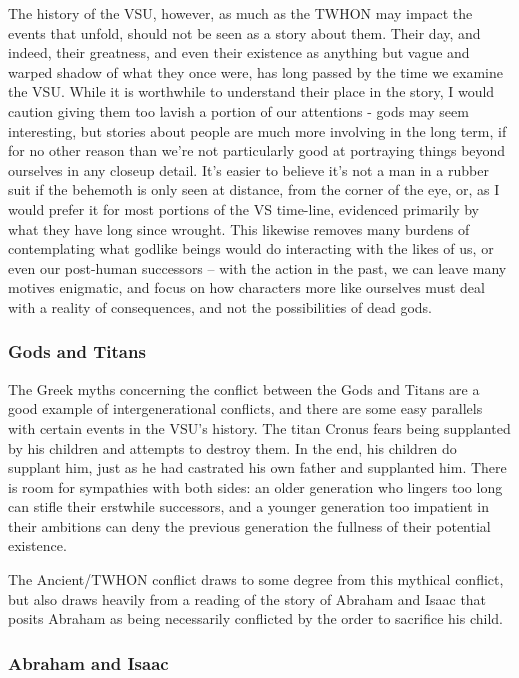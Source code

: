 The history of the VSU, however, as much as the TWHON may impact the
events that unfold, should not be seen as a story about them. Their
day, and indeed, their greatness, and even their existence as anything
but vague and warped shadow of what they once were, has long passed by
the time we examine the VSU. While it is worthwhile to understand
their place in the story, I would caution giving them too lavish a
portion of our attentions - gods may seem interesting, but stories
about people are much more involving in the long term, if for no other
reason than we're not particularly good at portraying things beyond
ourselves in any closeup detail. It's easier to believe it's not a man
in a rubber suit if the behemoth is only seen at distance, from the
corner of the eye, or, as I would prefer it for most portions of the
VS time-line, evidenced primarily by what they have long since
wrought. This likewise removes many burdens of contemplating what
godlike beings would do interacting with the likes of us, or even our
post-human successors -- with the action in the past, we can leave
many motives enigmatic, and focus on how characters more like
ourselves must deal with a reality of consequences, and not the
possibilities of dead gods.

\subsubsection{Gods and Titans}

The Greek myths concerning the conflict between the Gods and Titans
are a good example of intergenerational conflicts, and there are some
easy parallels with certain events in the VSU's history. The titan
Cronus fears being supplanted by his children and attempts to destroy
them. In the end, his children do supplant him, just as he had
castrated his own father and supplanted him. There is room for
sympathies with both sides: an older generation who lingers too long
can stifle their erstwhile successors, and a younger generation too
impatient in their ambitions can deny the previous generation the
fullness of their potential existence.

The Ancient/TWHON conflict draws to some degree from this mythical
conflict, but also draws heavily from a reading of the story of
Abraham and Isaac that posits Abraham as being necessarily conflicted
by the order to sacrifice his child.

\subsubsection{Abraham and Isaac}

